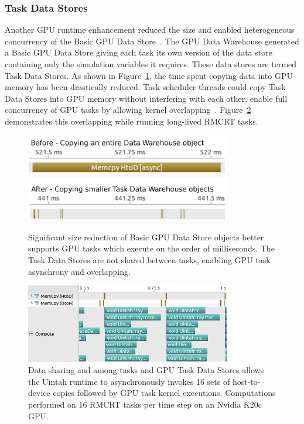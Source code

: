 \documentclass[12pt]{article}
\begin{document}
\subsubsection{Task Data Stores}
\label{ch:task_data_warehouse}


Another GPU runtime enhancement reduced the size and enabled heterogeneous concurrency of the Basic GPU Data Store~\cite{wolfhpc15}.  The GPU Data Warehouse generated a Basic GPU Data Store giving each task its own version of the data store containing only the simulation variables it requires.  These data stores are termed Task Data Stores.   As shown in Figure~\ref{fig:task-data-warehouse}, the time spent copying data into GPU memory has been drastically reduced.  Task scheduler threads could copy Task Data Stores into GPU memory without interfering with each other, enable full concurrency of GPU tasks by allowing kernel overlapping~\cite{ijpp16}.  Figure~\ref{fig:rmcrt-overlap} demonstrates this overlapping while running long-lived RMCRT tasks.  

\begin{figure}
	\centering
	\includegraphics[width=0.80\textwidth]{figures/task_datawarehouse.png}
	\caption{Significant size reduction of Basic GPU Data Store objects better supports GPU tasks which execute on the order of milliseconds.  The Task Data Stores are not shared between tasks, enabling GPU task asynchrony and overlapping. }
	\label{fig:task-data-warehouse}
\end{figure}

\begin{figure}
	\centering
	\includegraphics[width=0.80\textwidth]{figures/rmcrt_after_zoomed_sidebar.png}
	\caption{Data sharing and among tasks and GPU Task Data Stores allows the Uintah runtime to asynchronously invokes 16 sets of host-to-device copies followed by GPU task kernel executions.  Computations performed on 16 RMCRT tasks per time step on an Nvidia K20c GPU.}
	\label{fig:rmcrt-overlap}
\end{figure}
\end{document}
